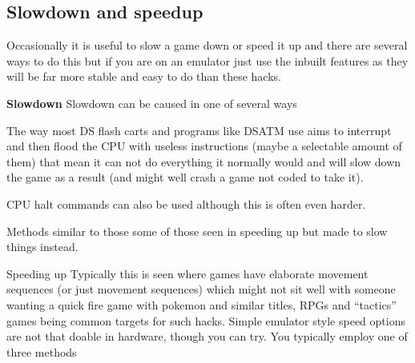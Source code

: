 \documentclass[
]{book}
\begin{document}
\hypertarget{slowdown-and-speedup}{%
\subsection{Slowdown and speedup}\label{slowdown-and-speedup}}

Occasionally it is useful to slow a game down or speed it up and there are several ways to do this but if you are on an emulator just use the inbuilt features as they will be far more stable and easy to do than these hacks.

\textbf{Slowdown} Slowdown can be caused in one of several ways

The way most DS flash carts and programs like DSATM use aims to interrupt and then flood the CPU with useless instructions (maybe a selectable amount of them) that mean it can not do everything it normally would and will slow down the game as a result (and might well crash a game not coded to take it).

CPU halt commands can also be used although this is often even harder.

Methods similar to those some of those seen in speeding up but made to slow things instead.

Speeding up Typically this is seen where games have elaborate movement sequences (or just movement sequences) which might not sit well with someone wanting a quick fire game with pokemon and similar titles, RPGs and ``tactics'' games being common targets for such hacks. Simple emulator style speed options are not that doable in hardware, though you can try. You typically employ one of three methods
\end{document}
